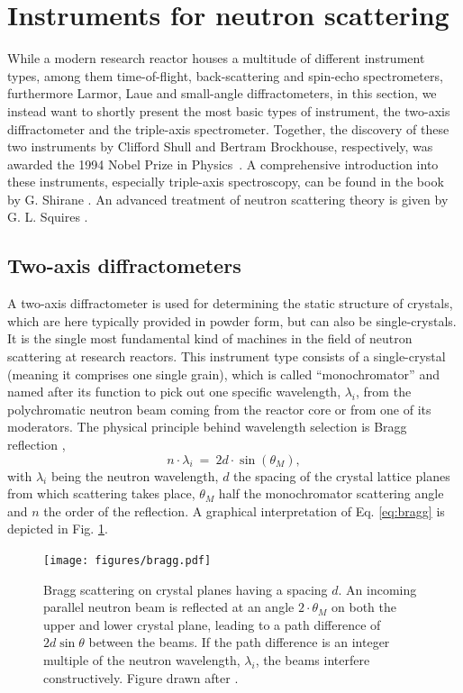 \section{Instruments for neutron scattering \label{sec:instruments}}

While a modern research reactor houses a multitude of different instrument types, among them time-of-flight, back-scattering and spin-echo spectrometers, furthermore Larmor, Laue and small-angle diffractometers, in this section, we instead want to shortly present the most basic types of instrument, the two-axis diffractometer and the triple-axis spectrometer. Together, the discovery of these two instruments by Clifford Shull and Bertram Brockhouse, respectively, was awarded the 1994 Nobel Prize in Physics~\cite{web_nobel1994}. A comprehensive introduction into these instruments, especially triple-axis spectroscopy, can be found in the book by G. Shirane \cite{Shirane2002}. An advanced treatment of neutron scattering theory is given by G. L. Squires \cite{Squires2012}.


\subsection{Two-axis diffractometers}

A two-axis diffractometer is used for determining the static structure of crystals, which are here typically provided in powder form, but can also be single-crystals. It is the single most fundamental kind of machines in the field of neutron scattering at research reactors. This instrument type consists of a single-crystal (meaning it comprises one single grain), which is called ``monochromator'' and named after its function to pick out one specific wavelength, $\lambda_i$, from the polychromatic neutron beam coming from the reactor core or from one of its moderators. The physical principle behind wavelength selection is Bragg reflection \cite[p. 68]{Gross2012} \cite[p. 13]{Shirane2002},
\begin{equation}
	\label{eq:bragg}
	n \cdot \lambda_i \ =\  2 d \cdot \sin\left( \theta_M \right),
\end{equation}
with $\lambda_i$ being the neutron wavelength, $d$ the spacing of the crystal lattice planes from which scattering takes place, $\theta_M$ half the monochromator scattering angle and $n$ the order of the reflection. A graphical interpretation of Eq. \ref{eq:bragg} is depicted in Fig. \ref{fig:braggscattering}.

\begin{figure}[htb]
	\centering
	\texttt{[image: figures/bragg.pdf]}
	\caption[Bragg scattering.]{
		Bragg scattering on crystal planes having a spacing $d$. An incoming parallel neutron beam is reflected at an angle $2 \cdot \theta_M$ on both the upper and lower crystal plane, leading to a path difference of $2d \sin\theta$ between the beams. If the path difference is an integer multiple of the neutron wavelength, $\lambda_i$, the beams interfere constructively. Figure drawn after \cite[p. 68, Fig. 2.7]{Gross2012}. }
	\label{fig:braggscattering}
\end{figure}

